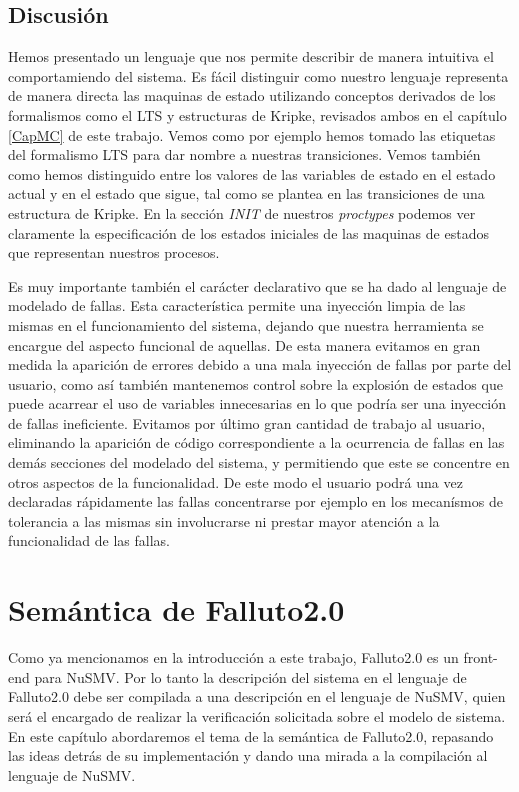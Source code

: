 \documentclass[titlepage, 12pt]{book}
\begin{document}
\section{Discusi\'on}
Hemos presentado un lenguaje que nos permite describir de manera intuitiva el comportamiendo del sistema. Es f\'acil distinguir como nuestro lenguaje representa de manera directa las maquinas de estado utilizando conceptos derivados de los formalismos como el LTS y estructuras de Kripke, revisados ambos en el cap\'itulo \ref{CapMC} de este trabajo. Vemos como por ejemplo hemos tomado las etiquetas del formalismo LTS para dar nombre a nuestras transiciones. Vemos tambi\'en como hemos distinguido entre los valores de las variables de estado en el estado actual y en el estado que sigue, tal como se plantea en las transiciones de una estructura de Kripke. En la secci\'on \textit{INIT} de nuestros \textit{proctypes} podemos ver claramente la especificaci\'on de los estados iniciales de las maquinas de estados que representan nuestros procesos.

Es muy importante tambi\'en el car\'acter declarativo que se ha dado al lenguaje de modelado de fallas. Esta caracter\'istica permite una inyecci\'on limpia de las mismas en el funcionamiento del sistema, dejando que nuestra herramienta se encargue del aspecto funcional de aquellas. De esta manera evitamos en gran medida la aparici\'on de errores debido a una mala inyecci\'on de fallas por parte del usuario, como as\'i tambi\'en mantenemos control sobre la explosi\'on de estados que puede acarrear el uso de variables innecesarias en lo que podr\'ia ser una inyecci\'on de fallas ineficiente. Evitamos por \'ultimo gran cantidad de trabajo al usuario, eliminando la aparici\'on de c\'odigo correspondiente a la ocurrencia de fallas en las dem\'as secciones del modelado del sistema, y permitiendo que este se concentre en otros aspectos de la funcionalidad. De este modo el usuario podr\'a una vez declaradas r\'apidamente las fallas concentrarse por ejemplo en los mecan\'ismos de tolerancia a las mismas sin involucrarse ni prestar mayor atenci\'on a la funcionalidad de las fallas.



\chapter{Sem\'antica de Falluto2.0}
\label{CapSemanticaDeFalluto}
Como ya mencionamos en la introducci\'on a este trabajo, Falluto2.0 es un front-end para NuSMV. Por lo tanto la descripci\'on del sistema en el lenguaje de Falluto2.0 debe ser compilada a una descripci\'on en el lenguaje de NuSMV, quien ser\'a el encargado de realizar la verificaci\'on solicitada sobre el modelo de sistema.  En este cap\'itulo abordaremos el tema de la sem\'antica de Falluto2.0, repasando las ideas detr\'as de su implementaci\'on y dando una mirada a la compilaci\'on al lenguaje de NuSMV.
\end{document}
